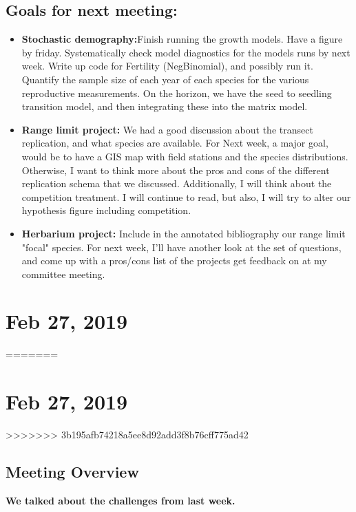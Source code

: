 \documentclass{article}
\begin{document}
\subsection*{Goals for next meeting:}
\begin{itemize}
\item{\textbf{Stochastic demography:}Finish running the growth models. Have a figure by friday. Systematically check model diagnostics for the models runs by next week. Write up code for Fertility (NegBinomial), and possibly run it. Quantify the sample size of each year of each species for the various reproductive measurements. On the horizon, we have the seed to seedling transition model, and then integrating these into the matrix model.}
\item{\textbf{Range limit project:} We had a good discussion about the transect replication, and what species are available. For Next week, a major goal, would be to have a GIS map with field stations and the species distributions. Otherwise, I want to think more about the pros and cons of the different replication schema that we discussed. Additionally, I will think about the competition treatment. I will continue to read, but also, I will try to alter our hypothesis figure including competition.}
\item{\textbf{Herbarium project:} Include in the annotated bibliography our range limit "focal" species. For next week, I'll have another look at the set of questions, and come up with a pros/cons list of the projects get feedback on at my committee meeting.}
\end{itemize}
  
  
\section*{Feb 27, 2019}
=======
  \section*{Feb 27, 2019}
>>>>>>> 3b195afb74218a5ee8d92add3f8b76cff775ad42
\subsection*{Meeting Overview}
\textbf{We talked about the challenges from last week.}
\end{document}
